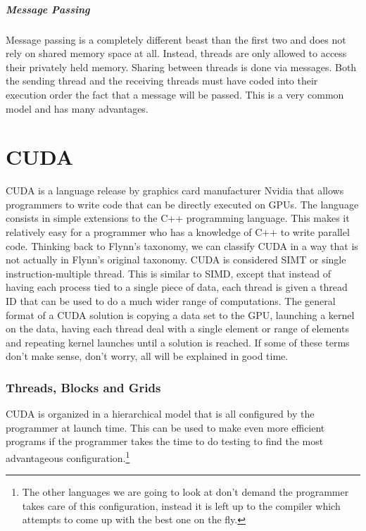 \documentclass{article}
\begin{document}
      \subsubsection{Message Passing}
      Message passing is a completely different beast than the first two and does not rely on shared memory space at all. \done{}Instead, threads are only allowed to access their privately held memory. Sharing between threads is done via messages. Both the sending thread and the receiving threads must have coded into their execution order the fact that a message will be passed. This is a very common model and has many advantages.

\part{CUDA}
CUDA is a language release by graphics card manufacturer Nvidia that allows programmers to write code that can be directly executed on GPUs. The language consists in simple extensions to the C++ programming language. This makes it relatively easy for a programmer who has a knowledge of C++ to write parallel code. Thinking back to Flynn's taxonomy, we can classify CUDA in a way that is not actually in Flynn's original taxonomy. CUDA is considered SIMT or single instruction-multiple thread. This is similar to SIMD, except that instead of having each process tied to a single piece of data, each thread is given a thread ID that can be used to do a much wider range of computations. The general format of a CUDA solution is copying a data set to the GPU, launching a kernel on the data, having each thread deal with a single element or range of elements and repeating kernel launches until a solution is reached. If some of these terms don't make sense, don't worry, all will be explained in good time.

	\section{Threads, Blocks and Grids}

    CUDA is organized in a hierarchical model that is all configured by the programmer at launch time. This can be used to make even more efficient programs if the programmer takes the time to do testing to find the most advantageous configuration.\footnote{The other languages we are going to look at don't demand the programmer takes care of this configuration, instead it is left up to the compiler which attempts to come up with the best one on the fly.}
\end{document}
